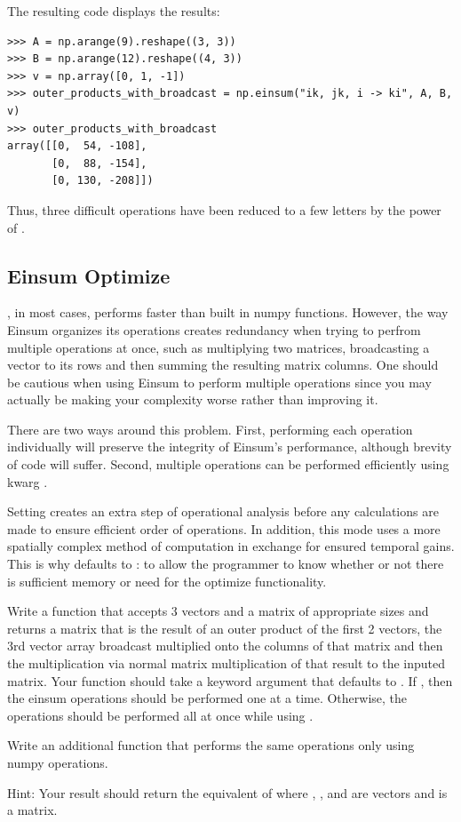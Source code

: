 The resulting code displays the results:
\begin{lstlisting}
>>> A = np.arange(9).reshape((3, 3))
>>> B = np.arange(12).reshape((4, 3))
>>> v = np.array([0, 1, -1])
>>> outer_products_with_broadcast = np.einsum("ik, jk, i -> ki", A, B, v)
>>> outer_products_with_broadcast
array([[0,  54, -108],
       [0,  88, -154],
       [0, 130, -208]])
\end{lstlisting}

\noindent Thus, three difficult operations have been reduced to a few letters by the power of .

\subsection*{Einsum Optimize}

, in most cases, performs faster than built in numpy functions.
However, the way Einsum organizes its operations creates redundancy when trying to perfrom multiple operations at once, such as multiplying two matrices, broadcasting a vector to its rows and then summing the resulting matrix columns.
One should be cautious when using Einsum to perform multiple operations since you may actually be making your complexity worse rather than improving it.

There are two ways around this problem.
First, performing each operation individually will preserve the integrity of Einsum's performance, although brevity of code will suffer.
Second, multiple operations can be performed efficiently using kwarg .

Setting  creates an extra step of operational analysis before any calculations are made to ensure efficient order of operations.
In addition, this mode uses a more spatially complex method of computation in exchange for ensured temporal gains.
This is why  defaults to : to allow the programmer to know whether or not there is sufficient memory or need for the optimize functionality.

\begin{problem}
Write a function that accepts 3 vectors and a matrix of appropriate sizes and returns a matrix that is the result of an outer product of the first 2 vectors, the 3rd vector array broadcast multiplied onto the columns of that matrix and then the multiplication via normal matrix multiplication of that result to the inputed matrix.
Your function should take a keyword argument  that defaults to . If , then the einsum operations should be performed one at a time.
Otherwise, the operations should be performed all at once while using .

Write an additional function that performs the same operations only using numpy operations.

Hint: Your result should return the equivalent of  where , , and  are vectors and  is a matrix.
\label{prob:outer product}
\end{problem}

